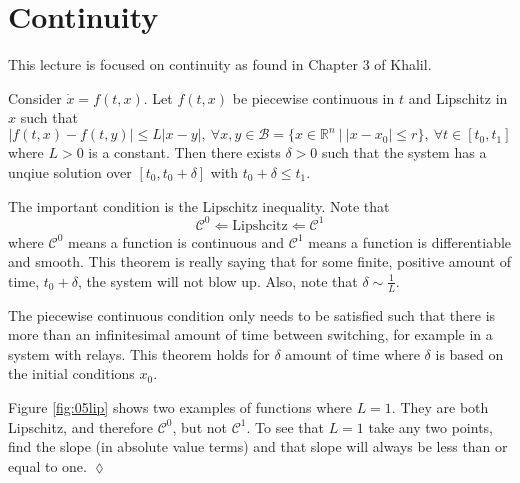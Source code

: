 
\mainmatter
\setcounter{page}{1}

\lectureseries[\course]{\course}

\date{January 19, 2010}

\setaddress

\setcounter{lecture}{4}
\setcounter{chapter}{4}


\section{Continuity}
This lecture is focused on continuity as found in Chapter 3 of Khalil.

\begin{theorem}
\label{th:05lip}
Consider $\dot{x} = f(t,x)$. Let $f(t,x)$ be piecewise continuous in $t$ and Lipschitz in $x$ such that
$$|f(t,x) - f(t,y)| \leq L|x-y|, ~\forall x,y\in\mathcal{B} = \{x\in\mathbb{R}^n ~|~ |x-x_0|\leq r\}, ~\forall t\in[t_0,t_1]$$
where $L>0$ is a constant. Then there exists $\delta>0$ such that the system has a unqiue solution over $[t_0,t_0+\delta]$ with $t_0+\delta\leq t_1$.
\end{theorem}

The important condition is the Lipschitz inequality. Note that
$$\mathcal{C}^0 \Leftarrow \text{Lipshcitz} \Leftarrow \mathcal{C}^1$$
where $\mathcal{C}^0$ means a function is continuous and $\mathcal{C}^1$ means a function is differentiable and smooth. This theorem is really saying that for some finite, positive amount of time, $t_0+\delta$, the system will not blow up. Also, note that $\delta\sim\frac{1}{L}$.

The piecewise continuous condition only needs to be satisfied such that there is more than an infinitesimal amount of time between switching, for example in a system with relays. This theorem holds for $\delta$ amount of time where $\delta$ is based on the initial conditions $x_0$.

\begin{example}
Figure \ref{fig:05lip} shows two examples of functions where $L=1$. They are both Lipschitz, and therefore $\mathcal{C}^0$, but not $\mathcal{C}^1$. To see that $L=1$ take any two points, find the slope (in absolute value terms) and that slope will always be less than or equal to one.
$\lozenge$
\end{example}

